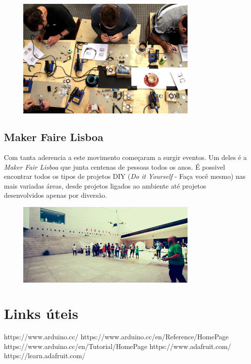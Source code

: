 \documentclass{article}
\begin{document}
\begin{figure}[h]
\centering
\includegraphics[width=0.8\textwidth]{img/makers}
\end{figure}

\subsection{Maker Faire Lisboa}
Com tanta aderencia a este movimento começaram a surgir eventos. Um deles é a \textit{Maker Fair Lisboa} que junta centenas de pessoas todos os anos. É possivel encontrar todos os tipos de projetos DIY (\textit{Do it Yourself} - Faça você mesmo) nas mais variadas áreas, desde projetos ligados ao ambiente até projetos desenvolvidos apenas por diversão.

\begin{figure}[h]
\centering
\includegraphics[width=0.8\textwidth]{img/mflisboa}
\end{figure}

\section{Links úteis}
https://www.arduino.cc/\newline
https://www.arduino.cc/en/Reference/HomePage\newline
https://www.arduino.cc/en/Tutorial/HomePage\newline
\vspace{2em}
https://www.adafruit.com/\newline
https://learn.adafruit.com/\newline \\
\end{document}
